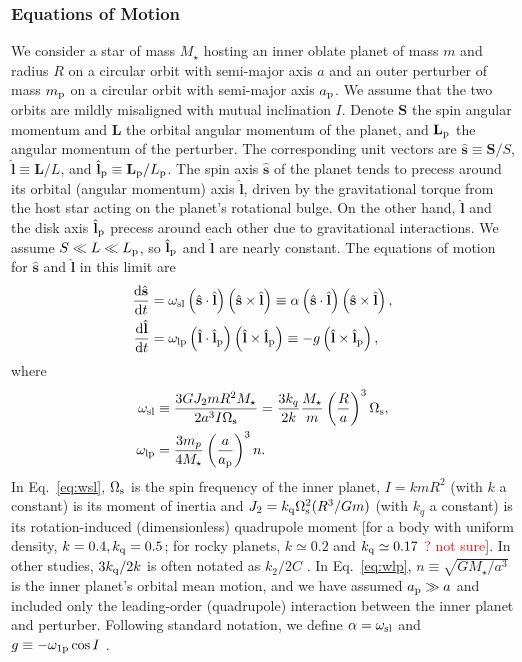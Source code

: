 \documentclass[
        fleqn,
        usenatbib,
    ]{mnras}
\newcommand*{\rd}[2]{\frac{\mathrm{d}#1}{\mathrm{d}#2}}
\newcommand*{\p}[1]{\left(#1\right)}
\newcommand*{\bm}[1]{\mathbf{#1}}
\newcommand*{\uv}[1]{\hat{\mathbf{#1}}}
\begin{document}
\subsubsection{Equations of Motion}

We consider a star of mass $M_\star$ hosting an inner oblate planet of mass $m$
and radius $R$ on a circular orbit with semi-major axis $a$ and an outer
perturber of mass $m_{\rm p}$ on a circular orbit with semi-major axis $a_{\rm
p}$. We assume that the two orbits are mildly misaligned with mutual inclination
$I$. Denote $\bm{S}$ the spin angular momentum and $\bm{L}$ the orbital angular
momentum of the planet, and $\bm{L}_{\rm p}$ the angular momentum of the
perturber. The corresponding unit vectors are $\uv{s} \equiv \bm{S} / S$,
$\uv{l} \equiv \bm{L} / L$, and $\uv{l}_{\rm p} \equiv \bm{L}_{\rm p} / L_{\rm
p}$. The spin axis $\uv{s}$ of the planet tends to precess around its orbital
(angular momentum) axis $\uv{l}$, driven by the gravitational torque from the
host star acting on the planet's rotational bulge. On the other hand, $\uv{l}$
and the disk axis $\uv{l}_{\rm p}$ precess around each other due to
gravitational interactions. We assume $S \ll L \ll L_{\rm p}$, so $\uv{l}_{\rm
p}$ and $\uv{l}$ are nearly constant. The equations of motion for $\uv{s}$ and
$\uv{l}$ in this limit are \citep{anderson2018teeter, su2020}
\begin{align}
    \rd{\uv{s}}{t}
        &= \omega_{\rm sl}\p{\uv{s} \cdot \uv{l}}\p{\uv{s} \times \uv{l}}
        \equiv \alpha\p{\uv{s} \cdot \uv{l}}\p{\uv{s} \times
        \uv{l}},\label{eq:dsdt1}\\
    \rd{\uv{l}}{t} &= \omega_{\rm lp}\p{\uv{l} \cdot \uv{l}_{\rm p}}\p{\uv{l}
        \times \uv{l}_{\rm p}} \equiv -g\p{\uv{l} \times \uv{l}_{\rm p}},
        \label{eq:dldt1}
\end{align}
where
\begin{align}
    \omega_{\rm sl} &\equiv \frac{3GJ_2 mR^2 M_\star}{2a^3 I\Omega_{\rm s}}
        = \frac{3k_q}{2k}\frac{M_\star}{m}\p{\frac{R}{a}}^3 \Omega_{\rm s},
            \label{eq:wsl}\\
    \omega_{\rm lp} &= \frac{3m_p}{4M_\star}\p{\frac{a}{a_{\rm p}}}^3
        n.\label{eq:wlp}
\end{align}
In Eq.~\eqref{eq:wsl}, $\Omega_{\rm s}$ is the spin frequency of the inner
planet, $I = k mR^2$ (with $k$ a constant) is its moment of inertia and $J_2 =
k_{\rm q}\Omega_{\rm s}^2 (R^3/Gm)$ (with $k_{q}$ a constant) is its rotation-induced
(dimensionless) quadrupole moment [for a body with uniform density, $k=0.4,
k_{\rm q}=0.5$; for rocky planets, $k\simeq 0.2$ and $k_{\rm q}\simeq 0.17$
\citep[e.g.][]{lainey2016quantification} \textcolor{red}{? not sure}]. In other
studies, $3k_{\rm q} / 2 k$ is often notated as $k_2 / 2C$
\citep[e.g.][]{millholland_disk}. In Eq.~\eqref{eq:wlp}, $n \equiv
\sqrt{GM_\star/a^3}$ is the inner planet's orbital mean motion,  and we have
assumed $a_{\rm p}\gg a$ and included only the leading-order (quadrupole)
interaction between the inner planet and perturber. Following standard notation,
we define $\alpha = \omega_{\rm sl}$ and $g \equiv -\omega_{\rm 1p} \cos I$
\citep[e.g.][]{colombo1966}.
\end{document}

